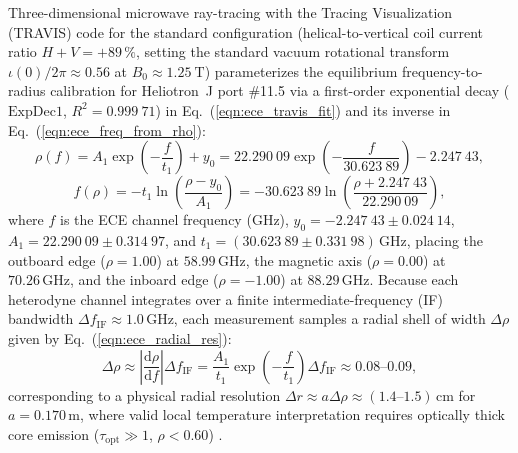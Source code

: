 Three-dimensional microwave ray-tracing with the Tracing Visualization (\textsc{TRAVIS}) code for the standard configuration (helical-to-vertical coil current ratio $H + V = +89\,\%$, setting the standard vacuum rotational transform $\iota(0)/2\pi \approx 0.56$ at $B_0 \approx 1.25~\mathrm{T}$) parameterizes the equilibrium frequency-to-radius calibration for Heliotron~J port \#11.5 \cite{luo2020measurement, Weir2019} via a first-order exponential decay ($\mathrm{ExpDec1}$, $R^2 = 0.999\ 71$) in Eq.~(\ref{eqn:ece_travis_fit}) and its inverse in Eq.~(\ref{eqn:ece_freq_from_rho}):
\begin{equation}
\label{eqn:ece_travis_fit}
\rho(f) = A_1 \exp\left(-\frac{f}{t_1}\right) + y_0 = 22.290\ 09 \exp\left(-\frac{f}{30.623\ 89}\right) - 2.247\ 43,
\end{equation}
\begin{equation}
\label{eqn:ece_freq_from_rho}
f(\rho) = -t_1 \ln\left(\frac{\rho - y_0}{A_1}\right) = -30.623\ 89 \ln\left(\frac{\rho + 2.247\ 43}{22.290\ 09}\right),
\end{equation}
\noindent where $f$ is the ECE channel frequency ($\mathrm{GHz}$), $y_0 = -2.247\ 43 \pm 0.024\ 14$, $A_1 = 22.290\ 09 \pm 0.314\ 97$, and $t_1 = (30.623\ 89 \pm 0.331\ 98)\,\mathrm{GHz}$, placing the outboard edge ($\rho = 1.00$) at $58.99\,\mathrm{GHz}$, the magnetic axis ($\rho = 0.00$) at $70.26\,\mathrm{GHz}$, and the inboard edge ($\rho = -1.00$) at $88.29\,\mathrm{GHz}$. Because each heterodyne channel integrates over a finite intermediate-frequency (IF) bandwidth $\Delta f_{\mathrm{IF}} \approx 1.0\,\mathrm{GHz}$, each measurement samples a radial shell of width $\Delta \rho$ given by Eq.~(\ref{eqn:ece_radial_res}):
\begin{equation}
\label{eqn:ece_radial_res}
\Delta \rho \approx \left| \frac{\mathrm{d}\rho}{\mathrm{d}f} \right| \Delta f_{\mathrm{IF}} = \frac{A_1}{t_1} \exp\left(-\frac{f}{t_1}\right) \Delta f_{\mathrm{IF}} \approx 0.08\text{--}0.09,
\end{equation}
\noindent corresponding to a physical radial resolution $\Delta r \approx a \Delta \rho \approx (1.4\text{--}1.5)\,\mathrm{cm}$ for $a = 0.170\,\mathrm{m}$, where valid local temperature interpretation requires optically thick core emission ($\tau_{\mathrm{opt}} \gg 1$, $\rho < 0.60$) \cite{luo2020measurement}.

